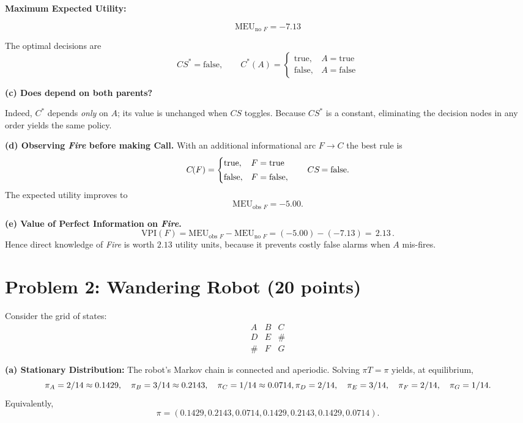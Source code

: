 \documentclass[11pt]{article}
\begin{document}
\bigskip
\textbf{Maximum Expected Utility:}

\vspace{-4pt}
\[
\boxed{\mathrm{MEU}_{\text{no }F}= -7.13}
\]

\noindent
The optimal decisions are
\[
CS^* = \mathrm{false}, \qquad
C^*(A) =
\begin{cases}
  \mathrm{true},  & A = \mathrm{true} \\[2pt]
  \mathrm{false}, & A = \mathrm{false}
\end{cases}
\]

\bigskip
\textbf{(c) Does  depend on both parents?}

Indeed, $C^*$ depends \emph{only} on $A$; its value is unchanged when
$CS$ toggles.  Because $CS^*$ is a constant, eliminating the decision
nodes in any order yields the same policy.


\bigskip
\textbf{(d) Observing \textit{Fire} before making Call.}
With an additional informational arc $F\!\rightarrow\!C$ the best rule is
\[
  C^{\*\!}(F)=
  \begin{cases}
    \mathrm{true},  & F=\mathrm{true}\\[2pt]
    \mathrm{false}, & F=\mathrm{false},
  \end{cases}\qquad
  CS^{\*\!}=\mathrm{false}.
  \]
  The expected utility improves to
  \[
  \boxed{\mathrm{MEU}_{\text{obs }F}= -5.00 }.
\]

\bigskip
\textbf{(e) Value of Perfect Information on \textit{Fire}.}
\[
  \mathrm{VPI}(F)=\mathrm{MEU}_{\text{obs }F}-\mathrm{MEU}_{\text{no }F}
  = (-5.00) - (-7.13) = \boxed{\,2.13\,}.
\]
Hence direct knowledge of \textit{Fire} is worth $2.13$ util\-ity units,
because it prevents costly false alarms when $A$ mis-fires.

\section*{Problem 2: Wandering Robot (20 points)}

Consider the grid of states:
\[
\begin{matrix}
A & B & C\\
D & E & \#\\
\# & F & G
\end{matrix}
\]

\textbf{(a) Stationary Distribution:}
The robot’s Markov chain is connected and aperiodic. Solving \(\pi T = \pi\) yields, at equilibrium,
\[
  \pi_A = 2/14 \approx 0.1429,\quad
  \pi_B = 3/14 \approx 0.2143,\quad
  \pi_C = 1/14 \approx 0.0714,\\
  \pi_D = 2/14,\quad
  \pi_E = 3/14,\quad
  \pi_F = 2/14,\quad
  \pi_G = 1/14.
\]
Equivalently,
\[
  \pi = (0.1429,0.2143,0.0714,0.1429,0.2143,0.1429,0.0714).
\]
\end{document}

